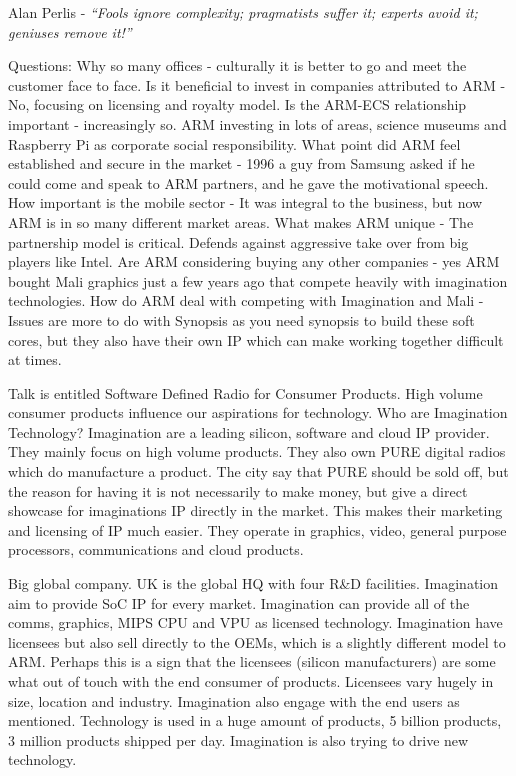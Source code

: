 Alan Perlis - \emph{``Fools ignore complexity; pragmatists suffer it; experts avoid it; geniuses remove it!''}

Questions:
Why so many offices - culturally it is better to go and meet the customer face to  face.
Is it beneficial to invest in companies attributed to ARM - No, focusing on licensing and royalty model.
Is the ARM-ECS relationship important - increasingly so. ARM investing in lots of areas, science museums and Raspberry Pi as corporate social responsibility.
What point did ARM feel established and secure in the market - 1996 a guy from Samsung asked if he could come and speak to ARM partners, and he gave the motivational speech.
How important is the mobile sector - It was integral to the business, but now ARM is in so many different market areas.
What makes ARM unique - The partnership model is critical. Defends against aggressive take over from big players like Intel.
Are ARM considering buying any other companies - yes ARM bought Mali graphics just a few years ago that compete heavily with imagination technologies.
How do ARM deal with competing with Imagination and Mali - Issues are more to do with Synopsis as you need synopsis to build these soft cores, but they also have their own IP which can make working together difficult at times.


Talk is entitled Software Defined Radio for Consumer Products. 
High volume consumer products influence our aspirations for technology. 
Who are Imagination Technology? 
Imagination are a leading silicon, software and cloud IP provider. 
They mainly focus on high volume products. 
They also own PURE digital radios which do manufacture a product. 
The city say that PURE should be sold off, but the reason for having it is not necessarily to make money, but give a direct showcase for imaginations IP directly in the market.
 This makes their marketing and licensing of IP much easier. 
They operate in graphics, video, general purpose processors, communications and cloud products. 

Big global company. 
UK is the global HQ with four R\&D facilities. 
Imagination aim to provide SoC IP for every market. Imagination can provide all of the comms, graphics, MIPS CPU and VPU as licensed technology.
 Imagination have licensees but also sell directly to the OEMs, which is a slightly different model to ARM. 
Perhaps this is a sign that the licensees (silicon manufacturers) are some what out of touch with the end consumer of products. 
Licensees vary hugely in size, location and industry. Imagination also engage with the end users as mentioned. 
Technology is used in a huge amount of products, 5 billion products, 3 million products shipped per day. 
Imagination is also trying to drive new technology.

